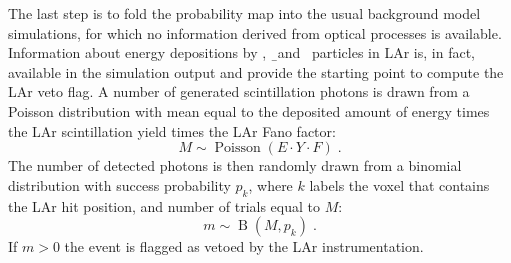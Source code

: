 \newpar
The last step is to fold the probability map into the usual background model simulations,
for which no information derived from optical processes is available. Information about
energy depositions by \g, \b\ and \a\ particles in LAr is, in fact, available in the
simulation output and provide the starting point to compute the LAr veto flag. A number
of generated scintillation photons is drawn from a Poisson distribution with mean equal to
the deposited amount of energy times the LAr scintillation yield times the LAr Fano
factor:
\[
  M \sim \operatorname{Poisson}(E \cdot Y \cdot F) \;.
\]
The number of detected photons is then randomly drawn from a binomial distribution with
success probability $p_k$, where $k$ labels the voxel that contains the LAr hit position,
and number of trials equal to $M$:
\[
  m \sim \operatorname{B}(M, p_k) \;.
\]
If $m>0$ the event is flagged as vetoed by the LAr instrumentation.

